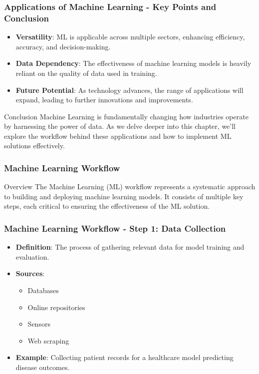 \documentclass{beamer}
\begin{document}
\begin{frame}[fragile]
    \frametitle{Applications of Machine Learning - Key Points and Conclusion}
    \begin{itemize}
        \item \textbf{Versatility}: ML is applicable across multiple sectors, enhancing efficiency, accuracy, and decision-making.
        \item \textbf{Data Dependency}: The effectiveness of machine learning models is heavily reliant on the quality of data used in training.
        \item \textbf{Future Potential}: As technology advances, the range of applications will expand, leading to further innovations and improvements.
    \end{itemize}
    
    \begin{block}{Conclusion}
        Machine Learning is fundamentally changing how industries operate by harnessing the power of data. As we delve deeper into this chapter, we'll explore the workflow behind these applications and how to implement ML solutions effectively.
    \end{block}
\end{frame}

\begin{frame}
    \frametitle{Machine Learning Workflow}
    \begin{block}{Overview}
        The Machine Learning (ML) workflow represents a systematic approach to building and deploying machine learning models. 
        It consists of multiple key steps, each critical to ensuring the effectiveness of the ML solution.
    \end{block}
\end{frame}

\begin{frame}
    \frametitle{Machine Learning Workflow - Step 1: Data Collection}
    \begin{itemize}
        \item \textbf{Definition}: The process of gathering relevant data for model training and evaluation.
        \item \textbf{Sources}:
            \begin{itemize}
                \item Databases
                \item Online repositories
                \item Sensors
                \item Web scraping
            \end{itemize}
        \item \textbf{Example}: Collecting patient records for a healthcare model predicting disease outcomes.
    \end{itemize}
\end{frame}
\end{document}
